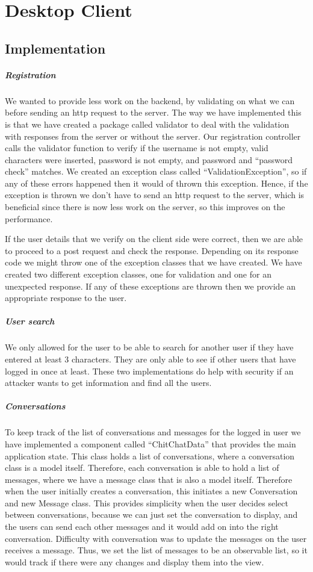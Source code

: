 \documentclass[11pt,a4paper]{report}
\begin{document}
\section{Desktop Client}

\subsection{Implementation}

\subparagraph{Registration}
We wanted to provide less work on the backend, by validating on what we can before sending an http request to the server. The way we have implemented this is that we have created a package called validator to deal with the validation with responses from the server or without the server. Our registration controller calls the validator function to verify if the username is not empty, valid characters were inserted, password is not empty, and password and “password check” matches. We created an exception class called “ValidationException”, so if any of these errors happened then it would of thrown this exception. Hence, if the exception is thrown we don’t have to send an http request to the server, which is beneficial since there is now less work on the server, so this improves on the performance.

If the user details that we verify on the client side were correct, then we are able to proceed to a post request and check the response. Depending on its response code we might throw one of the exception classes that we have created. We have created two different exception classes, one for validation and one for an unexpected response. If any of these exceptions are thrown then we provide an appropriate response to the user.

\subparagraph{User search}
We only allowed for the user to be able to search for another user if they have entered at least 3 characters. They are only able to see if other users that have logged in once at least. These two implementations do help with security if an attacker wants to get information and find all the users.

\subparagraph{Conversations}
To keep track of the list of conversations and messages for the logged in user we have implemented a component called “ChitChatData” that provides the main application state. This class holds a list of conversations, where a conversation class is a model itself. Therefore, each conversation is able to hold a list of messages, where we have a message class that is also a model itself. Therefore when the user initially creates a conversation, this initiates a new Conversation and new Message class. This provides simplicity when the user decides select between conversations, because we can just set the conversation to display, and the users can send each other messages and it would add on into the right conversation. Difficulty with conversation was to update the messages on the user receives a message. Thus, we set the list of messages to be an observable list, so it would track if there were any changes and display them into the view.
\end{document}
